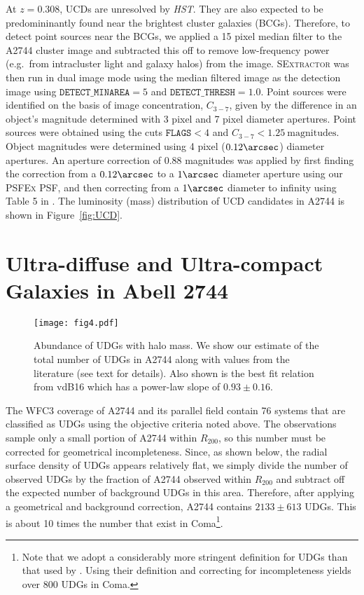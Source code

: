 \documentclass[iop,tighten,twocolumn,apj]{emulateapj}
\begin{document}
At $z = 0.308$, UCDs are unresolved by \textit{HST}. They are also expected to be
predomininantly found near the brightest cluster galaxies (BCGs).  Therefore,
to detect point sources near the BCGs, we applied a 15 pixel median filter to
the A2744 cluster image and subtracted this off to remove low-frequency power
(e.g.\ from intracluster light and galaxy halos) from the image.
\textsc{SExtractor} was then run in dual image mode using the median filtered
image as the detection image using $\mathtt{DETECT\_MINAREA} = 5$ and
$\mathtt{DETECT\_THRESH} = 1.0$. Point sources were identified on the basis of
image concentration, $C_{3-7}$, given by the difference in an object's
magnitude determined with 3 pixel and 7 pixel diameter apertures.  Point
sources were obtained using the cuts $\mathtt{FLAGS} < 4$ and $C_{3-7} <
1.25~\mathrm{magnitudes}$. Object magnitudes were determined using 4 pixel
($0.12\arcsec$) diameter apertures. An aperture correction of 0.88 magnitudes
was applied by first finding the correction from a $0.12\arcsec$ to a
$1\arcsec$ diameter aperture using our \textsc{PSFEx} PSF, and then correcting
from a $1\arcsec$ diameter to infinity using Table 5 in \cite{sirianni2005}.
The luminosity (mass) distribution of UCD candidates in A2744 is shown in
Figure~\ref{fig:UCD}.

\section{Ultra-diffuse and Ultra-compact Galaxies in Abell 2744}

\begin{figure}
	\texttt{[image: fig4.pdf]}
	\caption{
	Abundance of UDGs with halo mass. We show our estimate of the total
	number of UDGs in A2744 along with values from the literature (see
	text for details). Also shown is the best fit relation from
	vdB16 which has a power-law slope of $0.93 \pm 0.16$. 
	\label{fig:mass_scaling}
	}
\end{figure}

The WFC3 coverage of A2744 and its parallel field contain 76 systems that are
classified as UDGs using the objective criteria noted above. The observations
sample only a small portion of A2744 within $R_{200}$, so this number must be
corrected for geometrical incompleteness. Since, as shown below, the radial
surface density of UDGs appears relatively flat, we simply divide the number
of observed UDGs by the fraction of A2744 observed within $R_{200}$ and
subtract off the expected number of background UDGs in this area. Therefore,
after applying a geometrical and background correction, A2744 contains $2133
\pm 613$ UDGs. This is about 10 times the number that exist in
Coma\footnote{Note that we adopt a considerably more stringent definition for
UDGs than that used by \cite{koda2015}. Using their definition and correcting
for incompleteness yields over 800 UDGs in Coma.}.
\end{document}
